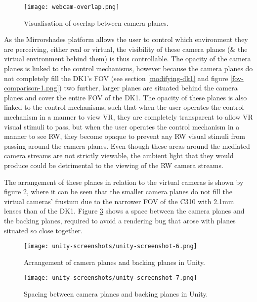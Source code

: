 \begin{figure}[h]
	\begin{center}
		\texttt{[image: webcam-overlap.png]}
		\caption{Visualisation of overlap between camera planes.}
		\label{webcam-overlap.png}
	\end{center}
\end{figure}

As the Mirrorshades platform allows the user to control which environment they are perceiving, either real or virtual, the visibility of these camera planes (\& the virtual environment behind them) is thus controllable. The opacity of the camera planes is linked to the control mechanisms, however because the camera planes do not completely fill the DK1's FOV (see section \ref{modifying-dk1} and figure \ref{fov-comparison-1.png}) two further, larger planes are situated behind the camera planes and cover the entire FOV of the DK1. The opacity of these planes is also linked to the control mechanisms, such that when the user operates the control mechanism in a manner to view VR, they are completely transparent to allow VR visual stimuli to pass, but when the user operates the control mechanism in a manner to see RW, they become opaque to prevent any RW visual stimuli from passing around the camera planes. Even though these areas around the mediated camera streams are not strictly viewable, the ambient light that they would produce could be detrimental to the viewing of the RW camera streams.

The arrangement of these planes in relation to the virtual cameras is shown by figure \ref{unity-screenshot-6.png}, where it can be seen that the smaller camera planes do not fill the virtual cameras' frustum due to the narrower FOV of the C310 with 2.1mm lenses than of the DK1. Figure \ref{unity-screenshot-7.png} shows a space between the camera planes and the backing planes, required to avoid a rendering bug that arose with planes situated so close together.

\begin{figure}[h]
	\begin{center}
		\texttt{[image: unity-screenshots/unity-screenshot-6.png]}
		\caption{Arrangement of camera planes and backing planes in Unity.}
		\label{unity-screenshot-6.png}
	\end{center}
\end{figure}

\begin{figure}[h]
	\begin{center}
		\texttt{[image: unity-screenshots/unity-screenshot-7.png]}
		\caption{Spacing between camera planes and backing planes in Unity.}
		\label{unity-screenshot-7.png}
	\end{center}
\end{figure}

